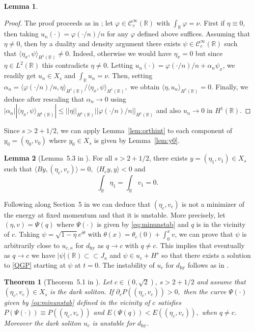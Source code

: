 \documentclass[11pt]{article}
\newcommand{\R}{\mathbb{R}}
\newcommand{\boC}{\mathcal{C}}
\theoremstyle{plain}
\newtheorem{theorem}{Theorem}[section]
\theoremstyle{definition}
\newtheorem{lemma}{Lemma}
\theoremstyle{remark}
\numberwithin{equation}{section}
\begin{document}
{\begin{lemma}
	\end{lemma}
	\begin{proof}
		The proof proceeds as in \cite{linbubbles}; let $\varphi\in\boC^\infty_c(\R) $ with $\int_\R\varphi=\nu$. First if $\eta\equiv0$, then taking $u_n(\cdot)=\varphi(\cdot/n)/n$ for any $\varphi$ defined above suffices.
		Assuming that $\eta\ne0$, then by a duality and density argument there exists $\psi\in\boC^\infty_c(\R)$ such that $\langle \eta_x,\psi\rangle_{ H^1(\R)}\ne0$. Indeed, otherwise we would have $\eta_x=0$ but since $\eta\in L^2(\R)$ this contradicts $\eta\ne0$. 
		Letting $u_n(\cdot)=\varphi(\cdot/n)/n+\alpha_n\psi_x$, we readily get $u_n\in X_s$ and $\int_\R u_n=\nu$.
		Then, setting $\alpha_n=\langle\varphi(\cdot/n)/n,\eta\rangle_{ H^1(\R)}/\langle\eta_x,\psi\rangle_{ H^1(\R)},$ we obtain $\langle\eta,u_n\rangle_{ H^1(\R)}=0$. Finally, we deduce after rescaling that $\alpha_n\to0$ using $|\alpha_n||\langle\eta_x,\psi\rangle_{ H^1(\R)}|\leq||\eta||_{ H^1(\R)}||\varphi(\cdot/n)/n||_{ H^1(\R)}$ and also $u_n\to0$ in $ H^1(\R)$.
	\end{proof}
	Since $s>2+1/2$, we can apply Lemma~\ref{lem:orthint} to each component of $y_0=(\eta_0,v_0)$ where $y_0\in X_s$ is given by Lemma~\ref{lem:y0}.
	\begin{lemma}[Lemma~5.3 in \cite{linbubbles}]\label{lem:dirneg}
		For all $s>2+1/2$, there exists $y=(\eta_1,v_1)\in X_s$ such that $\langle By,(\eta_c,v_c)\rangle=0,$ $\langle H_cy,y\rangle<0$ and 
		$$\int_\R \eta_1=\int_\R v_1=0.$$
	\end{lemma}
	Following along Section~5 in \cite{linbubbles} we can deduce that $(\eta_c,v_c)$ is not a minimizer of the energy at fixed momentum and that it is unstable. More precisely, let $(\eta,v)=\Psi(q)$ where $\Psi(\cdot)$ is given by \eqref{eq:minunstab} and $q$ is in the vicinity of $c$. Taking $\psi=\sqrt{1-\eta}e^{i\theta}$ with $\theta(x)=\theta_c(0)+\int_0^xv$, we can prove that $\psi$ is arbitrarily close to $u_{c,\kappa}$ for $d_{\mathrm{hy}}$ as $q\to c$ with $q\ne c$. This implies that eventually as $q\to c$ we have $|\psi|(\R)\subset\subset J_\kappa$ and $\psi\in u_{c}+ H^{{s}}$ so that there exists a solution to \eqref{QGP} starting at $\psi$ at $t=0$. The instability of $u_c$ for $d_{\mathrm{hy}}$ follows as in \cite{linbubbles}. 
	\begin{theorem}[Theorem~5.1 in \cite{linbubbles}]\label{thm:unstablin}
		Let $c\in(0,\sqrt{2})$, $s>2+1/2$ and assume that $(\eta_c,v_c)\in X_s$ is the dark soliton. If $\partial_cP((\eta_c,v_c))>0,$ then the curve $\Psi(\cdot)$ given by \eqref{eq:minunstab} defined in the vicinity of $c$ satisfies 
		$P(\Psi(\cdot))\equiv P((\eta_c,v_c))$ and $E(\Psi(q))<E((\eta_c,v_c)),$ when $q\ne c$. 
		Moreover the dark soliton $u_c$ is unstable for $d_\mathrm{hy}$.
	\end{theorem}
	
}
\end{document}
